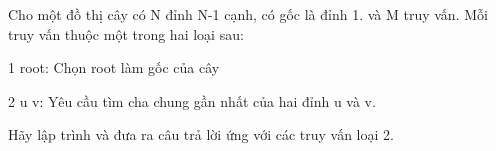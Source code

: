 Cho một đồ thị cây có N đỉnh N-1 cạnh, có gốc là đỉnh 1. và M truy vấn. Mỗi truy vấn thuộc một trong hai loại sau:  

   1 root: Chọn root làm gốc của cây  

   2 u v: Yêu cầu tìm cha chung gần nhất của hai đỉnh u và v.  

   Hãy lập trình và đưa ra câu trả lời ứng với các truy vấn loại 2.  

\